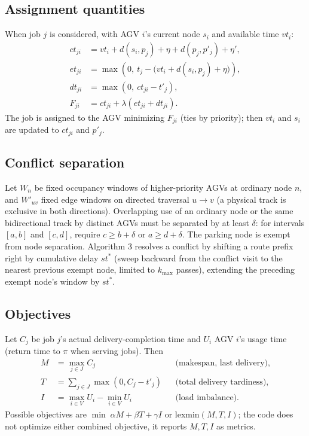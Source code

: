 \subsection{Assignment quantities}
When job $j$ is considered, with AGV $i$'s current node $s_i$ and available time $vt_i$:
\begin{align*}
  ct_{ji} &= vt_i + d(s_i,p_j) + \eta + d(p_j,p'_j) + \eta',\\
  et_{ji} &= \max\!\left(0,\ t_j-\bigl(vt_i+d(s_i,p_j)+\eta\bigr)\right),\\
  dt_{ji} &= \max(0,\ ct_{ji}-t'_j),\\
  F_{ji} &= ct_{ji}+\lambda(et_{ji}+dt_{ji}).
\end{align*}
The job is assigned to the AGV minimizing $F_{ji}$ (ties by priority); then $vt_i$ and $s_i$ are updated to $ct_{ji}$ and $p'_j$.

\subsection{Conflict separation}
Let $W_n$ be fixed occupancy windows of higher-priority AGVs at ordinary node $n$, and $W'_{uv}$ fixed edge windows on directed traversal $u\to v$ (a physical track is exclusive in both directions). Overlapping use of an ordinary node or the same bidirectional track by distinct AGVs must be separated by at least $\delta$: for intervals $[a,b]$ and $[c,d]$, require $c\ge b+\delta$ or $a\ge d+\delta$. The parking node is exempt from node separation. Algorithm 3 resolves a conflict by shifting a route prefix right by cumulative delay $st^*$ (sweep backward from the conflict visit to the nearest previous exempt node, limited to $k_{\max}$ passes), extending the preceding exempt node's window by $st^*$.

\subsection{Objectives}
Let $C_j$ be job $j$'s actual delivery-completion time and $U_i$ AGV $i$'s usage time (return time to $\pi$ when serving jobs). Then
\begin{align*}
  M &= \max_{j\in J} C_j &&\text{(makespan, last delivery)},\\
  T &= \sum_{j\in J}\max(0,C_j-t'_j) &&\text{(total delivery tardiness)},\\
  I &= \max_{i\in V}U_i-\min_{i\in V}U_i &&\text{(load imbalance)}.
\end{align*}
Possible objectives are $\min\;\alpha M+\beta T+\gamma I$ or lexmin$(M,T,I)$; the code does not optimize either combined objective, it reports $M,T,I$ as metrics.

